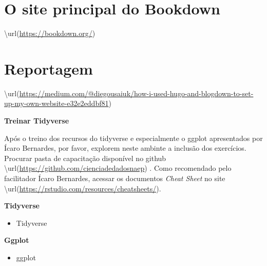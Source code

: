 \documentclass[
]{book}
\providecommand{\tightlist}{%
  \setlength{\itemsep}{0pt}\setlength{\parskip}{0pt}}
\begin{document}
\hypertarget{o-site-principal-do-bookdown}{%
\section{O site principal do Bookdown}\label{o-site-principal-do-bookdown}}

\textbackslash url(\url{https://bookdown.org/})

\hypertarget{reportagem}{%
\section{Reportagem}\label{reportagem}}

\textbackslash url(\url{https://medium.com/@diegousaiuk/how-i-used-hugo-and-blogdown-to-set-up-my-own-website-e32e2eddbf81})

\textbf{Treinar Tidyverse}

Após o treino dos recursos do tidyverse e
especialmente o ggplot apresentados por
Ícaro Bernardes, por favor,
explorem neste ambinte a inclusão dos exercícios.
Procurar pasta de capacitação disponível no github
\textbackslash url(\url{https://github.com/cienciadedadosnaep}) .
Como recomendado pelo facilitador Ícaro Bernardes,
acessar os documentos \emph{Cheat Sheet} no site
\textbackslash url(\url{https://rstudio.com/resources/cheatsheets/}).

\textbf{Tidyverse}

\begin{itemize}
\tightlist
\item
  Tidyverse
\end{itemize}

\textbf{Ggplot}

\begin{itemize}
\tightlist
\item
  ggplot
\end{itemize}

  
\end{document}
